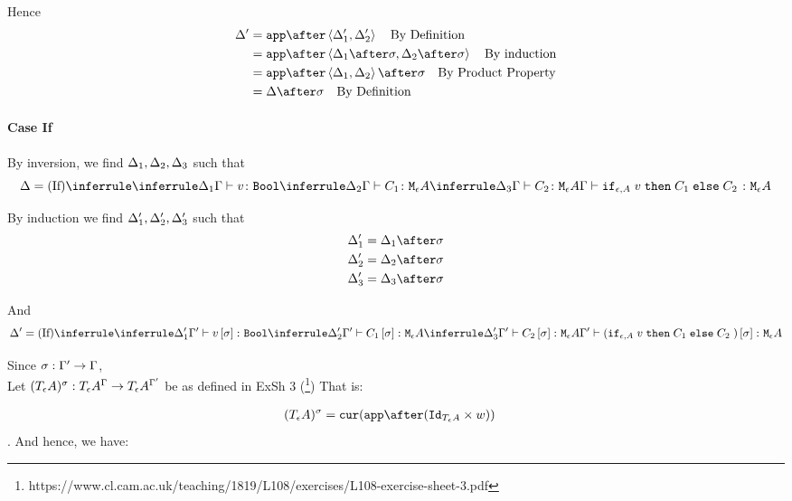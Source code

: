 {    Hence
    \begin{align}
        \D' &= \app\after\pr{\D_1'}{\D_2'}\qt{By Definition}\\
            &= \app\after\pr{\D_1\after\si}{\D_2\after\si}\qt{By induction}\\
            &= \app\after\pr{\D_1}{\D_2}\after\si\qt{By Product Property}\\
            & = \D\after\si\qt{By Definition}\\
    \end{align}

    \paragraph{Case If}


    By inversion, we find $\Delta_1, \Delta_2, \Delta_3$ such that
    \begin{equation}
        \D = \ntreeruleIII{If}{\treeruleI{\D_1}{\typerelation{\G}{v}{\B}}}{\treeruleI{\D_2}{\typerelation{\G}{C_1}{\mea}}}{\treeruleI{\D_3}{\typerelation{\G}{C_2}{\mea}}}{\typerelation{\G}{\ifthenelse{\e}{A}{v}{C_1}{C_2}}{\mea}}
    \end{equation}

    By induction we find $\Delta_1', \Delta_2', \Delta_3'$ such that 
    \begin{align}
        \D_1' &= \D_1\after\si\\
        \D_2' &= \D_2\after\si\\
        \D_3' &= \D_3\after\si\\
    \end{align}

    And
    \begin{equation}
        \D' = \ntreeruleIII{If}{\treeruleI{\D_1'}{\typerelation{\G'}{v\ssi}{\B}}}{\treeruleI{\D_2'}{\typerelation{\G'}{C_1\ssi}{\mea}}}{\treeruleI{\D_3'}{\typerelation{\G'}{C_2\ssi}{\mea}}}{\typerelation{\G'}{(\ifthenelse{\e}{A}{v}{C_1}{C_2})\ssi}{\mea}}
    \end{equation}

    Since $\sigma: \Gamma' \rightarrow \Gamma$, \\
    Let $(T_{\epsilon}{A})^{\sigma}: T_{\epsilon}{A}^{\Gamma}\rightarrow T_{\epsilon}{A}^{\Gamma'}$ be as defined in ExSh 3 (\footnote{https://www.cl.cam.ac.uk/teaching/1819/L108/exercises/L108-exercise-sheet-3.pdf})
    That is:

    \begin{align}
        (\tea)^{\si} & = \cur{\app\after(\Id{\tea}\times w)}
    \end{align}.
    And hence, we have:

}
